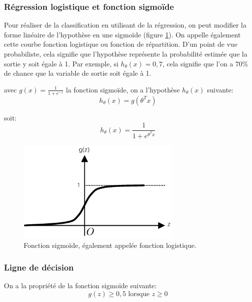\subsubsection{Régression logistique et fonction sigmoïde}
\label{Le Machine Learning: Les différents algorithmes: La regression logistique: Régression logistique et fonction sigmoïde}
Pour réaliser de la classification en utilisant de la régression,  on peut modifier la forme linéaire de l'hypothèse en une sigmoïde (figure \ref{fig:Fonction sigmoïde}). On appelle également cette courbe fonction logistique ou fonction de répartition. D'un point de vue probabiliste, cela signifie que l'hypothèse représente la probabilité estimée que la sortie y soit égale à 1. Par exemple, si $h_\theta(x)=0,7$, cela signifie que l'on a 70\% de chance que la variable de sortie soit égale à 1.  

avec $g(x) = \frac{1}{1 + e^{-z}}$  la fonction sigmoïde, on a l'hypothèse $h_\theta(x)$ suivante: 
\begin{equation}
	h_\theta(x)=g(\theta^Tx) 
\end{equation}

soit: 
\begin{equation}
h_\theta(x)=\frac{1}{1 + e^{\theta^Tx}} 
\end{equation}

\begin{figure}[h]
	\centering\includegraphics[height=5cm]{images/sigmoid.png}
	\caption[Fonction sigmoïde]{Fonction sigmoïde, également appelée fonction logistique.}
	\label{fig:Fonction sigmoïde}
\end{figure}

\subsubsection{Ligne de décision}
\label{Le Machine Learning: Les différents algorithmes: La regression logistique: Ligne de décision}
On a la propriété de la fonction sigmoïde suivante: 
\begin{equation}
 g(z) \ge 0,5 \text{ lorsque } z \ge 0
\end{equation}

